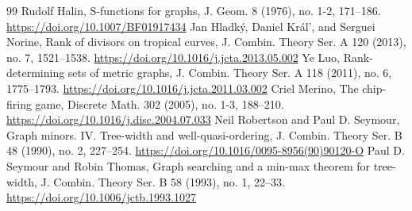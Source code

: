 \documentclass[10pt]{amsart}
\begin{document}
\begin{thebibliography}{99}
 Rudolf Halin, S-functions for graphs, J. Geom. 8 (1976), no. 1-2, 171–186. \url{https://doi.org/10.1007/BF01917434}
 Jan Hladký, Daniel Král’, and Serguei Norine, Rank of divisors on tropical curves, J. Combin. Theory Ser. A 120 (2013), no. 7, 1521–1538. \url{https://doi.org/10.1016/j.jcta.2013.05.002}
 Ye Luo, Rank-determining sets of metric graphs, J. Combin. Theory Ser. A 118 (2011), no. 6, 1775–1793. \url{https://doi.org/10.1016/j.jcta.2011.03.002}
 Criel Merino, The chip-ﬁring game, Discrete Math. 302 (2005), no. 1-3, 188–210. \url{https://doi.org/10.1016/j.disc.2004.07.033}
 Neil Robertson and Paul D. Seymour, Graph minors. IV. Tree-width and well-quasi-ordering, J. Combin. Theory Ser. B 48 (1990), no. 2, 227–254. \url{https://doi.org/10.1016/0095-8956(90)90120-O}
 Paul D. Seymour and Robin Thomas, Graph searching and a min-max theorem for tree-width, J. Combin. Theory Ser. B 58 (1993), no. 1, 22–33. \url{https://doi.org/10.1006/jctb.1993.1027}
\end{thebibliography}
\end{document}
